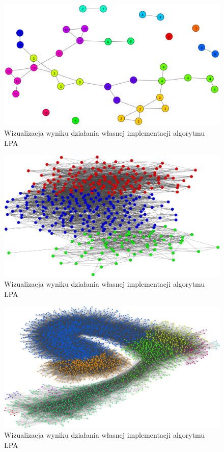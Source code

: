 \documentclass{article}
\begin{document}
\begin{figure}[H]
\centering
\includegraphics[width=\textwidth]{images/ms-lpa-0.png}
\caption{Wizualizacja wyniku działania własnej implementacji algorytmu LPA} 
\end{figure}

\begin{figure}[H]
\centering
\includegraphics[width=\textwidth]{images/ms-lpa-2.png}
\caption{Wizualizacja wyniku działania własnej implementacji algorytmu LPA}
\end{figure}

\begin{figure}[H]
\centering
\includegraphics[width=\textwidth]{images/ms-nba.png}
\caption{Wizualizacja wyniku działania własnej implementacji algorytmu LPA}
\end{figure}
\end{document}
